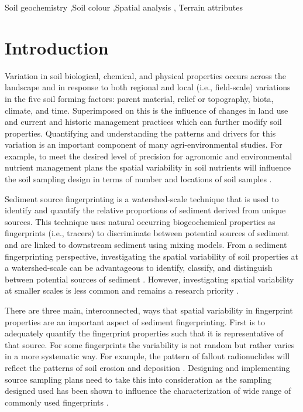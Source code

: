\documentclass[
  number]{elsarticle}
\begin{document}
\begin{frontmatter}
\begin{keyword}
    Soil geochemistry \sep Soil colour \sep Spatial analysis \sep 
    Terrain attributes
\end{keyword}
\end{frontmatter}
    

\section{Introduction}\label{introduction}

Variation in soil biological, chemical, and physical properties occurs
across the landscape and in response to both regional and local (i.e.,
field-scale) variations in the five soil forming factors: parent
material, relief or topography, biota, climate, and time. Superimposed
on this is the influence of changes in land use and current and historic
management practices which can further modify soil properties.
Quantifying and understanding the patterns and drivers for this
variation is an important component of many agri-environmental studies.
For example, to meet the desired level of precision for agronomic and
environmental nutrient management plans the spatial variability in soil
nutrients will influence the soil sampling design in terms of number and
locations of soil samples \citep{starr1995, kariuki2009}.

Sediment source fingerprinting is a watershed-scale technique that is
used to identify and quantify the relative proportions of sediment
derived from unique sources. This technique uses natural occurring
biogeochemical properties as fingerprints (i.e., tracers) to
discriminate between potential sources of sediment and are linked to
downstream sediment using mixing models. From a sediment fingerprinting
perspective, investigating the spatial variability of soil properties at
a watershed-scale can be advantageous to identify, classify, and
distinguish between potential sources of sediment \citep{pulley2017}.
However, investigating spatial variability at smaller scales is less
common \citep[e.g.,][]{du2017, pulley2018, collins2019, lunamiño2024}
and remains a research priority \citep{collins2020}.

There are three main, interconnected, ways that spatial variability in
fingerprint properties are an important aspect of sediment
fingerprinting. First is to adequately quantify the fingerprint
properties such that it is representative of that source. For some
fingerprints the variability is not random but rather varies in a more
systematic way. For example, the pattern of fallout radionuclides will
reflect the patterns of soil erosion and deposition
\citep{wilkinson2015}. Designing and implementing source sampling plans
need to take this into consideration as the sampling designed used has
been shown to influence the characterization of wide range of commonly
used fingerprints \citep{lunamiño2024}.
\end{document}
